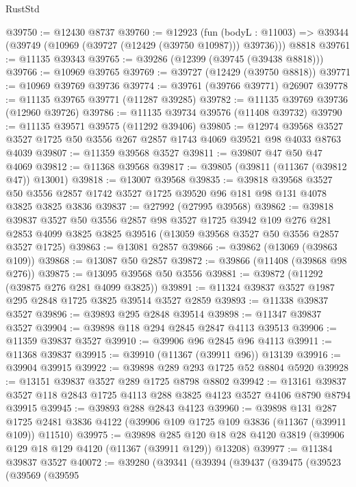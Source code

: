 \begin{lexlean}{RustStd}
\begin{coremodule}
@39750 := @12430 @8737
@39760 := @12923
    (fun (bodyL : @11003) => @39344 (@39749 (@10969 (@39727 (@12429 (@39750 @10987))) @39736)))
    @8818
@39761 := @11135 @39343
@39765 := @39286 (@12399 (@39745 (@39438 @8818)))
@39766 := @10969 @39765
@39769 := @39727 (@12429 (@39750 @8818))
@39771 := @10969 @39769 @39736
@39774 := @39761 (@39766 @39771) @26907
@39778 := @11135 @39765 @39771 (@11287 @39285)
@39782 := @11135 @39769 @39736 (@12960 @39726)
@39786 := @11135 @39734 @39576 (@11408 @39732)
@39790 := @11135 @39571 @39575 (@11292 @39406)
@39805 := @12974
    @39568
    @3527
    @3527
    @1725
    @50
    @3556
    @267
    @2857
    @1743
    @4069
    @39521
    @98
    @4033
    @8763
    @4039
@39807 := @11359 @39568 @3527
@39811 := @39807 @47 @50 @47 @4069
@39812 := @11368 @39568
@39817 := @39805 (@39811 (@11367 (@39812 @47)) @13001)
@39818 := @13007 @39568
@39835 := @39818
    @39568
    @3527
    @50
    @3556
    @2857
    @1742
    @3527
    @1725
    @39520
    @96
    @181
    @98
    @131
    @4078
    @3825
    @3825
    @3836
@39837 := @27992 (@27995 @39568)
@39862 := @39818
    @39837
    @3527
    @50
    @3556
    @2857
    @98
    @3527
    @1725
    @3942
    @109
    @276
    @281
    @2853
    @4099
    @3825
    @3825
    @39516
    (@13059 @39568 @3527 @50 @3556 @2857 @3527 @1725)
@39863 := @13081 @2857
@39866 := @39862 (@13069 (@39863 @109))
@39868 := @13087 @50 @2857
@39872 := @39866 (@11408 (@39868 @98 @276))
@39875 := @13095 @39568 @50 @3556
@39881 := @39872 (@11292 (@39875 @276 @281 @4099 @3825))
@39891 := @11324 @39837 @3527 @1987 @295 @2848 @1725 @3825 @39514 @3527 @2859
@39893 := @11338 @39837 @3527
@39896 := @39893 @295 @2848 @39514
@39898 := @11347 @39837 @3527
@39904 := @39898 @118 @294 @2845 @2847 @4113 @39513
@39906 := @11359 @39837 @3527
@39910 := @39906 @96 @2845 @96 @4113
@39911 := @11368 @39837
@39915 := @39910 (@11367 (@39911 @96)) @13139
@39916 := @39904 @39915
@39922 := @39898 @289 @293 @1725 @52 @8804 @5920
@39928 := @13151 @39837 @3527 @289 @1725 @8798 @8802
@39942 := @13161 @39837 @3527 @118 @2843 @1725 @4113 @288 @3825 @4123 @3527 @4106 @8790 @8794 @39915
@39945 := @39893 @288 @2843 @4123
@39960 := @39898
    @131
    @287
    @1725
    @2481
    @3836
    @4122
    (@39906 @109 @1725 @109 @3836 (@11367 (@39911 @109)) @11510)
@39975 := @39898
    @285
    @120
    @18
    @28
    @4120
    @3819
    (@39906 @129 @18 @129 @4120 (@11367 (@39911 @129)) @13208)
@39977 := @11384 @39837 @3527
@40072 := @39280
    (@39341
      (@39394
        (@39437
          (@39475
            (@39523
              (@39569
                (@39595

\end{coremodule}
\end{lexlean}
